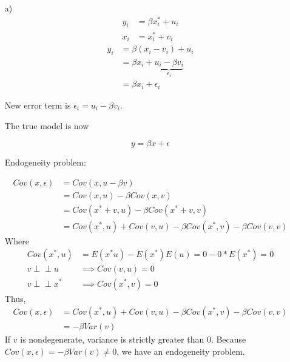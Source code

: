 \documentclass[
]{article}
\begin{document}
\begin{enumerate}
\item[a)]
$$\begin{aligned}
y_i &= \beta x_i^* + u_i \\
x_i &= x_i^* + v_i
\end{aligned}$$
$$\begin{aligned}
y_i &= \beta(x_i - v_i) + u_i \\
&= \beta x_i + \underbrace{u_i - \beta v_i}_{\epsilon_i} \\
&= \beta x_i + \epsilon_i
\end{aligned}$$

New error term is $\epsilon_i = u_i - \beta v_i$.  

The true model is now 

\[y = \beta x + \epsilon\]
  
Endogeneity problem: 

$$\begin{aligned}
Cov(x, \epsilon) &= Cov(x, u - \beta v) \\
&= Cov(x, u) - \beta Cov(x, v) \\
&= Cov(x^* + v, u) - \beta Cov(x^* + v, v) \\
&= Cov(x^*, u) + Cov(v, u) - \beta Cov(x^*, v) -\beta Cov(v, v)
\end{aligned}$$
Where
$$\begin{aligned}
Cov(x^*, u) &= E(x^* u) - E(x^*)E(u) = 0 - 0 * E(x^*) = 0 \\
v \perp \!\!\!\perp u &\implies Cov(v, u) = 0 \\
v \perp \!\!\!\perp x^* &\implies Cov(x^*, v) =0 
\end{aligned}$$
Thus, 
$$\begin{aligned}
Cov(x, \epsilon) &= Cov(x^*, u) + Cov(v, u) - \beta Cov(x^*, v) -\beta Cov(v, v) \\
&= -\beta Var(v)
\end{aligned}$$
If $v$ is nondegenerate, variance is strictly greater than 0. Because $Cov(x, \epsilon) = -\beta Var(v) \ne 0$, we have an endogeneity problem. 



\end{enumerate}
\end{document}
